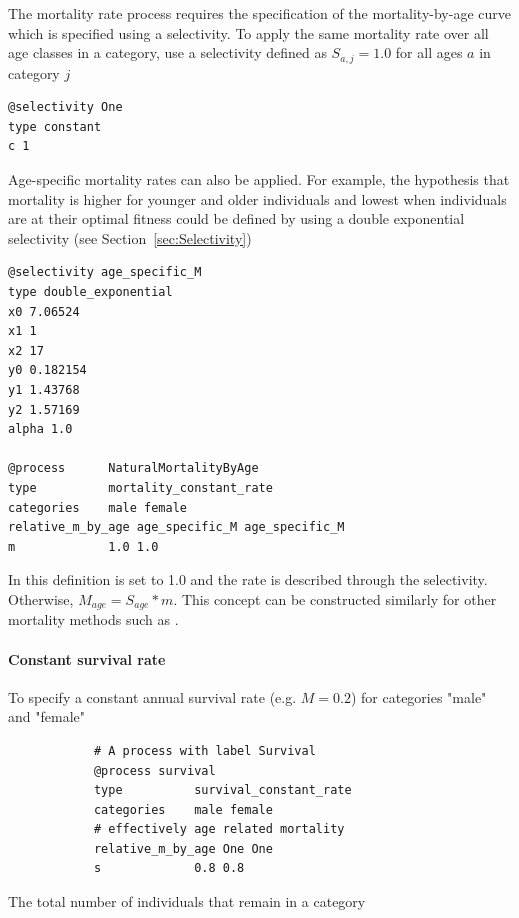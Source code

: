 The mortality rate process requires the specification of the mortality-by-age curve which is specified using a selectivity. To apply the same mortality rate over all age classes in a category, use a selectivity defined as $S_{a,j}=1.0$ for all ages $a$ in category $j$

{\small{\begin{verbatim}
@selectivity One
type constant
c 1
\end{verbatim}}}

Age-specific mortality rates can also be applied. For example, the hypothesis that mortality is higher for younger and older individuals and lowest when individuals are at their optimal fitness could be defined by using a double exponential selectivity (see Section~\ref{sec:Selectivity})

{\small{\begin{verbatim}
@selectivity age_specific_M
type double_exponential
x0 7.06524
x1 1
x2 17
y0 0.182154
y1 1.43768
y2 1.57169
alpha 1.0

@process      NaturalMortalityByAge
type          mortality_constant_rate
categories    male female
relative_m_by_age age_specific_M age_specific_M
m             1.0 1.0
\end{verbatim}}}


In this definition  is set to 1.0 and the rate is described through the selectivity. Otherwise, $M_{age} = S_{age} * m$. This concept can be constructed similarly for other mortality methods such as .

\paragraph{Constant survival rate}\label{sec:Process-SurvivalConstantRate} 

To specify a constant annual survival rate (e.g. $M=0.2$) for categories "male" and "female"

{\small{\begin{verbatim}
			# A process with label Survival
			@process survival
			type          survival_constant_rate
			categories    male female
			# effectively age related mortality
			relative_m_by_age One One
			s             0.8 0.8
\end{verbatim}}}

The total number of individuals that remain in a category

